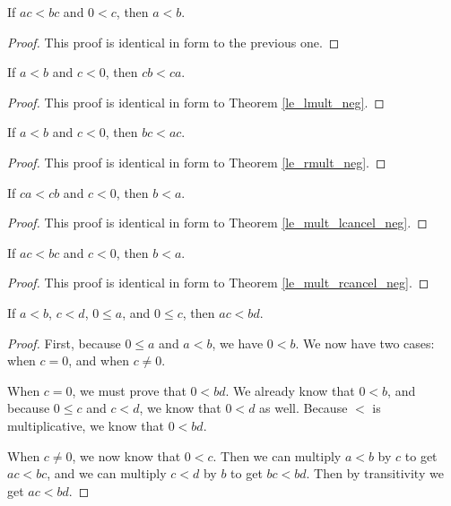\documentclass[../math.tex]{subfiles}
\begin{document}
\begin{theorem}
    If $ac < bc$ and $0 < c$, then $a < b$.
\end{theorem}
\begin{proof}
    This proof is identical in form to the previous one.
\end{proof}

\begin{theorem}
    If $a < b$ and $c < 0$, then $cb < ca$.
\end{theorem}
\begin{proof}
    This proof is identical in form to Theorem \ref{le_lmult_neg}.
\end{proof}

\begin{theorem}
    If $a < b$ and $c < 0$, then $bc < ac$.
\end{theorem}
\begin{proof}
    This proof is identical in form to Theorem \ref{le_rmult_neg}.
\end{proof}

\begin{theorem}
    If $ca < cb$ and $c < 0$, then $b < a$.
\end{theorem}
\begin{proof}
    This proof is identical in form to Theorem \ref{le_mult_lcancel_neg}.
\end{proof}

\begin{theorem}
    If $ac < bc$ and $c < 0$, then $b < a$.
\end{theorem}
\begin{proof}
    This proof is identical in form to Theorem \ref{le_mult_rcancel_neg}.
\end{proof}

\begin{theorem}
    If $a < b$, $c < d$, $0 \leq a$, and $0 \leq c$, then $ac < bd$.
\end{theorem}
\begin{proof}
    First, because $0 \leq a$ and $a < b$, we have $0 < b$.  We now have two
    cases: when $c = 0$, and when $c \neq 0$.

    When $c = 0$, we must prove that $0 < bd$.  We already know that $0 < b$,
    and because $0 \leq c$ and $c < d$, we know that $0 < d$ as well.  Because
    $<$ is multiplicative, we know that $0 < bd$.

    When $c \neq 0$, we now know that $0 < c$.  Then we can multiply $a < b$ by
    $c$ to get $ac < bc$, and we can multiply $c < d$ by $b$ to get $bc < bd$.
    Then by transitivity we get $ac < bd$.
\end{proof}
\end{document}
